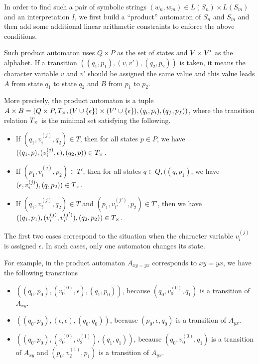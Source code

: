\documentclass[sigplan,review,anonymous]{acmart}\settopmatter{printfolios=true,printccs=false,printacmref=false}
\begin{document}
In order to find such a pair of symbolic strings $(w_n,w_m) \in L(S_n)\times L(S_m)$ and an interpretation $I$, we first build a ``product'' automaton of $S_n$ and $S_m$ and then add some additional linear arithmetic constraints to enforce the above conditions.

Such product automaton uses $Q\times P$ as the set of states and 
$V\times V'$
as the alphabet. If a transition $((q_1,p_1), (v,v'),(q_2,p_2))$ is taken, it means the character variable $v$ and $v'$ should be assigned the same value and this value leads $A$ from state $q_1$ to state $q_2$ and $B$ from $p_1$ to $p_2$.

More precisely, the product automaton is a tuple $A \times B = (Q\times P, T_\times, (V \cup \{\epsilon\}) \times (V' \cup \{\epsilon\} ), (q_i,p_i),(q_f,p_f))$, where the transition relation $T_\times$ is the minimal set satisfying the following.

\begin{itemize}
\item If $(q_1,v_i^{(j)},q_2) \in T$, then for all states $p\in P$, we have $((q_1,p),(v_i^{(j)},\epsilon),(q_2,p))\in T_\times$.
\item If $(p_1,v_i^{(j)},p_2) \in T'$, then for all states $q\in Q,((q,p_1)$, we have $(\epsilon,v_i^{(j)}),(q,p_2))\in T_\times$.
\item If $(q_1,v_i^{(j)},q_2) \in T$ and $(p_1,v_{i'}^{(j')},p_2) \in T'$, then we have $((q_1,p_1),(v_i^{(j)},v_{i'}^{(j')}),(q_2,p_2))\in T_\times$.
\end{itemize}	
The first two cases correspond to the situation when the character variable $v_i^{(j)}$ is assigned $\epsilon$. In such cases, only one automaton changes its state.

For example, in the product automaton $A_{xy=yx}$ corresponds to $xy=yx$, we have the following transitions
\begin{itemize}
	\item $((q_0,p_0), (v_0^{(0)},\epsilon),(q_1,p_0))$, because $(q_0,v_0^{(0)},q_1)$ is a transition of $A_{xy}$.
	\item $((q_0,p_0), (\epsilon,\epsilon),(q_0,q_0))$, because $(p_0,\epsilon,q_0)$ is a transition of $A_{yx}$.
	\item $((q_0,p_0), (v_0^{(0)},v_2^{(1)}),(q_1,q_1))$, because $(q_0,v_0^{(0)},q_1)$ is a transition of $A_{xy}$ and $(p_0,v_2^{(1)},p_1)$ is a transition of $A_{yx}$.
\end{itemize}
\end{document}
